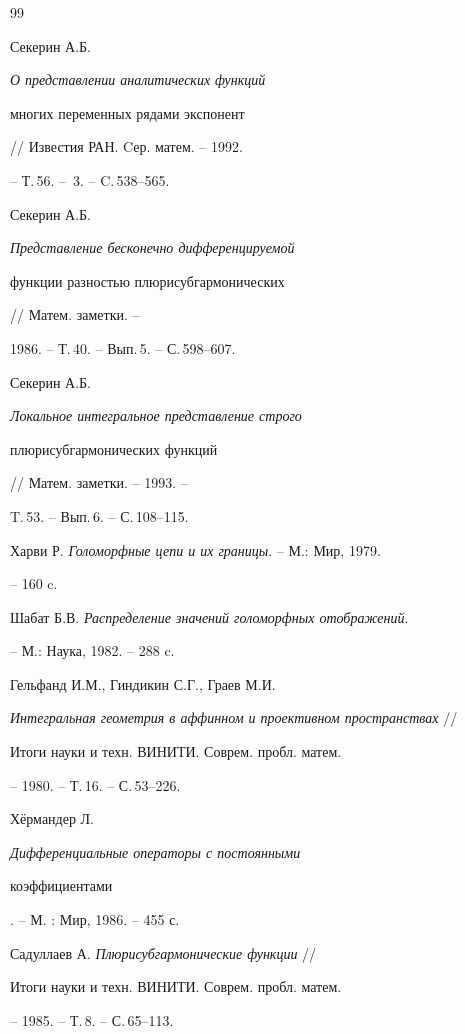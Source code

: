 \begin{thebibliography}{99}


Секерин А.Б. {\em О представлении аналитических функций 


многих переменных рядами экспонент} // Известия РАН. Cер. матем. -- 1992. 


-- Т.\,56. -- \No\,3. -- C.\,538--565. 




Секерин А.Б. {\em Представление бесконечно дифференцируемой


функции разностью плюрисубгармонических} // Матем. заметки. --


1986. -- Т.\,40. -- Вып.\,5. -- С.\,598--607.




Секерин А.Б. {\em Локальное интегральное представление строго


плюрисубгармонических функций} // Матем. заметки. -- 1993. --  


T.\,53. -- Вып.\,6. -- С.\,108--115. 




Харви Р. {\em Голоморфные цепи и их границы}. -- М.: Мир, 1979. 


-- 160 c. 




Шабат Б.В. {\em Распределение значений голоморфных отображений}. 


-- М.: Наука, 1982. -- 288 c. 




Гельфанд И.М., Гиндикин С.Г., Граев М.И. 


{\em Интегральная геометрия в аффинном и проективном пространствах} // 


Итоги науки и техн. ВИНИТИ. Соврем. пробл. матем.


-- 1980. -- Т.\,16. -- С.\,53--226. 




Х\"ермандер Л. {\em Дифференциальные операторы с постоянными


коэффициентами}. -- М. : Мир, 1986. -- 455 с. 




Садуллаев А. {\em Плюрисубгармонические функции} // 


Итоги науки и техн. ВИНИТИ. Соврем. пробл. матем.


-- 1985. -- Т.\,8. -- С.\,65--113. 





\end{thebibliography}
